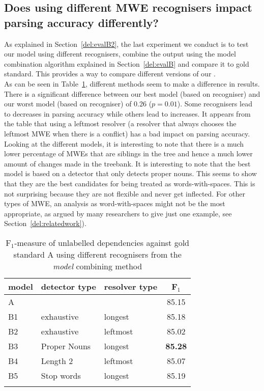 \documentclass[output=paper]{langsci/langscibook}
\begin{document}
\subsection{Does using different MWE recognisers impact parsing accuracy differently?}
\label{del:q2}
\indent As explained in Section~\ref{del:evalB2}, the last experiment we conduct is to test our model using different recognisers, combine the output using the model combination algorithm explained in Section~\ref{del:evalB} and compare it to gold standard. This provides a way to compare different versions of our {\modelB}.\\	
\indent As can be seen in Table~\ref{del:tab:res3}, different  methods seem to make a difference in results. There is a significant difference between our best model (based on recogniser) and our worst model (based on recogniser) of 0.26 ($p=0.01$). Some recognisers lead to decreases in parsing accuracy while others lead to increases. It appears from the table that using a leftmost resolver (a resolver that always chooses the leftmost MWE when there is a conflict) has a bad impact on parsing accuracy. Looking at the different models, it is interesting to note that there is a much lower percentage of MWEs that are siblings in the tree and hence a much lower amount of changes made in the treebank. It is interesting to note that the best model is based on a detector that only detects proper nouns. This seems to show that they are the best candidates for being treated as words-with-spaces. This is not surprising because they are not flexible and never get inflected. For other types of MWE, an analysis as word-with-spaces might not be the most appropriate, as argued by many researchers \citep{sag02} to give just one example, see Section~\ref{del:relatedwork}).

\begin{table}[h]
    \centering
    \begin{tabular}{l l l c} %
      \lsptoprule
        \textnormal{model}
        & \textnormal{detector type}
        & \textnormal{resolver type}
        & \textnormal{F$_1$}
        \\ %
        \midrule
        A &  &  & 85.15\\ \midrule
        B1 & exhaustive & longest & 85.18 \\
        B2 & exhaustive & leftmost & 85.02 \\
        B3 & Proper Nouns & longest & \textbf{85.28} \\
        B4 & Length 2 & leftmost & 85.07 \\
        B5 & Stop words & longest & 85.19 \tabularnewline %
        \lspbottomrule
    \end{tabular}
    \caption{F$_1$-measure of unlabelled dependencies against gold standard A using different recognisers from the \textit{model} combining method\label{del:tab:res3}}
\end{table}
\end{document}
